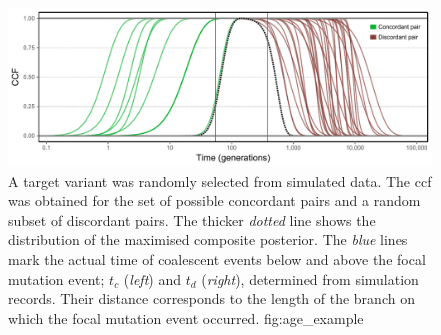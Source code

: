 

\begin{figure}[!htb]
\centering
\includegraphics[width=\textwidth]{./img/ch5/age_example_new}
%
{A target variant was randomly selected from simulated data.
The \gls{ccf} was obtained for the set of possible concordant pairs and a random subset of discordant pairs.
The thicker \emph{dotted} line shows the distribution of the maximised composite posterior.
The \emph{blue} lines mark the actual time of coalescent events below and above the focal mutation event; \ie $t_c$ (\emph{left}) and $t_d$ (\emph{right}), determined from simulation records.
Their distance corresponds to the length of the branch on which the focal mutation event occurred.}%
{fig:age_example}
\end{figure}
